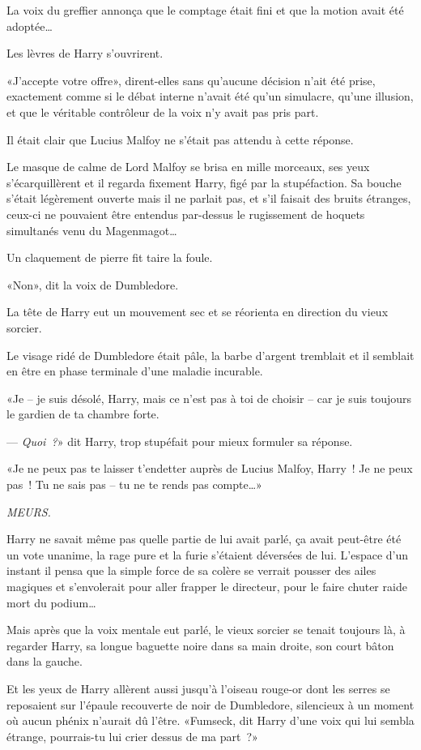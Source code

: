 La voix du greffier annonça que le comptage était fini et que la motion avait été adoptée…

Les lèvres de Harry s'ouvrirent.

«J'accepte votre offre», dirent-elles sans qu'aucune décision n'ait été prise, exactement comme si le débat interne n'avait été qu'un simulacre, qu'une illusion, et que le véritable contrôleur de la voix n'y avait pas pris part.

Il était clair que Lucius Malfoy ne s'était pas attendu à cette réponse.

Le masque de calme de Lord Malfoy se brisa en mille morceaux, ses yeux s'écarquillèrent et il regarda fixement Harry, figé par la stupéfaction. Sa bouche s'était légèrement ouverte mais il ne parlait pas, et s'il faisait des bruits étranges, ceux-ci ne pouvaient être entendus par-dessus le rugissement de hoquets simultanés venu du Magenmagot…

Un claquement de pierre fit taire la foule.

«Non», dit la voix de Dumbledore.

La tête de Harry eut un mouvement sec et se réorienta en direction du vieux sorcier.

Le visage ridé de Dumbledore était pâle, la barbe d'argent tremblait et il semblait en être en phase terminale d'une maladie incurable.

«Je -- je suis désolé, Harry, mais ce n'est pas à toi de choisir -- car je suis toujours le gardien de ta chambre forte.

--- \emph{Quoi~?}» dit Harry, trop stupéfait pour mieux formuler sa réponse.

«Je ne peux pas te laisser t'endetter auprès de Lucius Malfoy, Harry~! Je ne peux pas~! Tu ne sais pas -- tu ne te rends pas compte…»

\emph{MEURS.}

Harry ne savait même pas quelle partie de lui avait parlé, ça avait peut-être été un vote unanime, la rage pure et la furie s'étaient déversées de lui. L'espace d'un instant il pensa que la simple force de sa colère se verrait pousser des ailes magiques et s'envolerait pour aller frapper le directeur, pour le faire chuter raide mort du podium…

Mais après que la voix mentale eut parlé, le vieux sorcier se tenait toujours là, à regarder Harry, sa longue baguette noire dans sa main droite, son court bâton dans la gauche.

Et les yeux de Harry allèrent aussi jusqu'à l'oiseau rouge-or dont les serres se reposaient sur l'épaule recouverte de noir de Dumbledore, silencieux à un moment où aucun phénix n'aurait dû l'être. «Fumseck, dit Harry d'une voix qui lui sembla étrange, pourrais-tu lui crier dessus de ma part~?»

